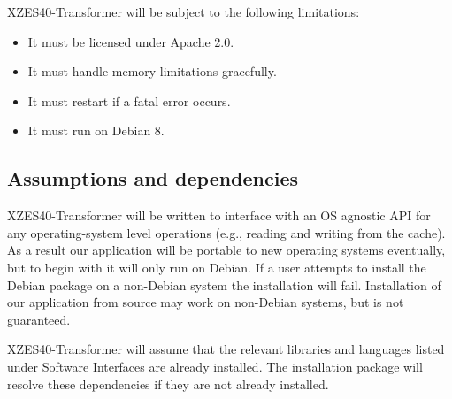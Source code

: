 XZES40-Transformer will be subject to the following limitations:

\begin{itemize}
  \item It must be licensed under Apache 2.0.
  \item It must handle memory limitations gracefully.
  \item It must restart if a fatal error occurs.
  \item It must run on Debian 8.
\end{itemize}


\subsection{Assumptions and dependencies}

XZES40-Transformer will be written to interface with an OS agnostic API for any operating-system level operations (e.g., reading and writing from the cache).
As a result our application will be portable to new operating systems eventually, but to begin with it will only run on Debian.
If a user attempts to install the Debian package on a non-Debian system the installation will fail.
Installation of our application from source may work on non-Debian systems, but is not guaranteed.

XZES40-Transformer will assume that the relevant libraries and languages listed under Software Interfaces are already installed.
The installation package will resolve these dependencies if they are not already installed.

